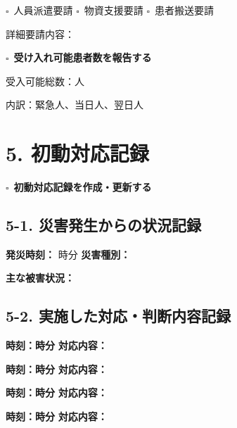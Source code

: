 \documentclass[a4paper,12pt]{jarticle}
\newcommand{\checkbox}{$\square$\ }
\newcommand{\underlinespace}[1]{\underline{\hspace{#1}}}
\begin{document}
\quad \checkbox 人員派遣要請 \quad \checkbox 物資支援要請 \quad \checkbox 患者搬送要請

\quad 詳細要請内容：\underlinespace{10cm}

\vspace{4mm}

\checkbox \textbf{受け入れ可能患者数を報告する}

\quad 受入可能総数：\underlinespace{2cm}人

\quad 内訳：緊急\underlinespace{2cm}人、当日\underlinespace{2cm}人、翌日\underlinespace{2cm}人

\vspace{5mm}

\newpage

\section*{5. 初動対応記録}

\checkbox \textbf{初動対応記録を作成・更新する}

\subsection*{5-1. 災害発生からの状況記録}

\textbf{発災時刻：} \underlinespace{1cm}時\underlinespace{1cm}分 \quad \textbf{災害種別：} \underlinespace{6cm}

\vspace{3mm}

\textbf{主な被害状況：}

\underlinespace{15cm}

\underlinespace{15cm}

\vspace{3mm}

\subsection*{5-2. 実施した対応・判断内容記録}

\textbf{時刻：\underlinespace{1cm}時\underlinespace{1cm}分} \quad \textbf{対応内容：} \underlinespace{10cm}

\textbf{時刻：\underlinespace{1cm}時\underlinespace{1cm}分} \quad \textbf{対応内容：} \underlinespace{10cm}

\textbf{時刻：\underlinespace{1cm}時\underlinespace{1cm}分} \quad \textbf{対応内容：} \underlinespace{10cm}

\textbf{時刻：\underlinespace{1cm}時\underlinespace{1cm}分} \quad \textbf{対応内容：} \underlinespace{10cm}
\end{document}
